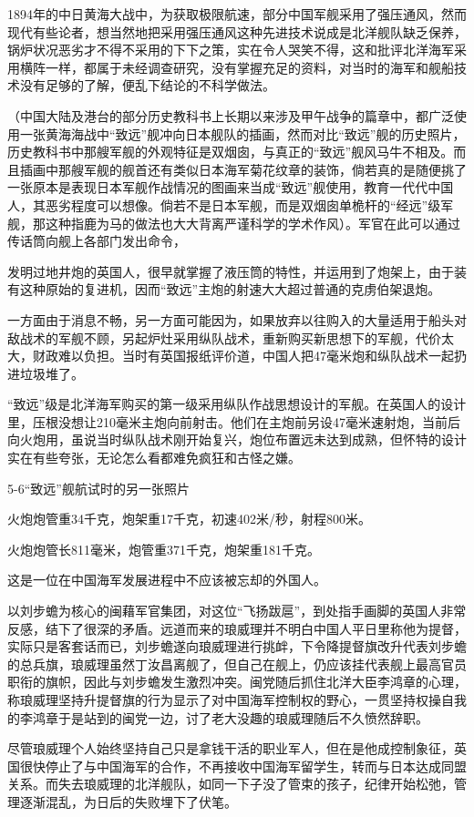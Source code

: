 \documentclass[12pt,UTF8]{ctexbook}
\begin{document}
1894年的中日黄海大战中，为获取极限航速，部分中国军舰采用了强压通风，然而现代有些论者，想当然地把采用强压通风这种先进技术说成是北洋舰队缺乏保养，锅炉状况恶劣才不得不采用的下下之策，实在令人哭笑不得，这和批评北洋海军采用横阵一样，都属于未经调查研究，没有掌握充足的资料，对当时的海军和舰船技术没有足够的了解，便乱下结论的不科学做法。

（中国大陆及港台的部分历史教科书上长期以来涉及甲午战争的篇章中，都广泛使用一张黄海海战中“致远”舰冲向日本舰队的插画，然而对比“致远”舰的历史照片，历史教科书中那艘军舰的外观特征是双烟囱，与真正的“致远”舰风马牛不相及。而且插画中那艘军舰的舰首还有类似日本海军菊花纹章的装饰，倘若真的是随便挑了一张原本是表现日本军舰作战情况的图画来当成“致远”舰使用，教育一代代中国人，其恶劣程度可以想像。倘若不是日本军舰，而是双烟囱单桅杆的“经远”级军舰，那这种指鹿为马的做法也大大背离严谨科学的学术作风）。军官在此可以通过传话筒向舰上各部门发出命令，

发明过地井炮的英国人，很早就掌握了液压筒的特性，并运用到了炮架上，由于装有这种原始的复进机，因而“致远”主炮的射速大大超过普通的克虏伯架退炮。

一方面由于消息不畅，另一方面可能因为，如果放弃以往购入的大量适用于船头对敌战术的军舰不顾，另起炉灶采用纵队战术，重新购买新思想下的军舰，代价太大，财政难以负担。当时有英国报纸评价道，中国人把47毫米炮和纵队战术一起扔进垃圾堆了。

“致远”级是北洋海军购买的第一级采用纵队作战思想设计的军舰。在英国人的设计里，压根没想让210毫米主炮向前射击。他们在主炮前另设47毫米速射炮，当前后向火炮用，虽说当时纵队战术刚开始复兴，炮位布置远未达到成熟，但怀特的设计实在有些夸张，无论怎么看都难免疯狂和古怪之嫌。

5-6“致远”舰航试时的另一张照片

火炮炮管重34千克，炮架重17千克，初速402米/秒，射程800米。

火炮炮管长811毫米，炮管重371千克，炮架重181千克。


这是一位在中国海军发展进程中不应该被忘却的外国人。

以刘步蟾为核心的闽藉军官集团，对这位“飞扬跋扈”，到处指手画脚的英国人非常反感，结下了很深的矛盾。远道而来的琅威理并不明白中国人平日里称他为提督，实际只是客套话而已，刘步蟾遂向琅威理进行挑衅，下令降提督旗改升代表刘步蟾的总兵旗，琅威理虽然丁汝昌离舰了，但自己在舰上，仍应该挂代表舰上最高官员职衔的旗帜，因此与刘步蟾发生激烈冲突。闽党随后抓住北洋大臣李鸿章的心理，称琅威理坚持升提督旗的行为显示了对中国海军控制权的野心，一贯坚持权操自我的李鸿章于是站到的闽党一边，讨了老大没趣的琅威理随后不久愤然辞职。

尽管琅威理个人始终坚持自己只是拿钱干活的职业军人，但在是他成控制象征，英国很快停止了与中国海军的合作，不再接收中国海军留学生，转而与日本达成同盟关系。而失去琅威理的北洋舰队，如同一下子没了管束的孩子，纪律开始松弛，管理逐渐混乱，为日后的失败埋下了伏笔。
\end{document}
